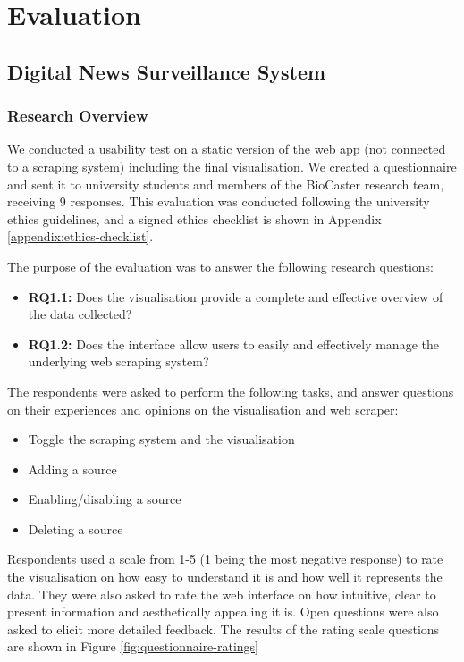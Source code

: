 \documentclass{l4proj}
\begin{document}
\chapter{Evaluation}

\section{Digital News Surveillance System}
\subsection{Research Overview}
We conducted a usability test on a static version of the web app (not connected to a scraping system) including the final visualisation. We created a questionnaire and sent it to university students and members of the BioCaster research team, receiving 9 responses. This evaluation was conducted following the university ethics guidelines, and a signed ethics checklist is shown in Appendix \ref{appendix:ethics-checklist}. \par
The purpose of the evaluation was to answer the following research questions:
\begin{itemize}
    \item \textbf{RQ1.1: } Does the visualisation provide a complete and effective overview of the data collected?
    \item \textbf{RQ1.2: } Does the interface allow users to easily and effectively manage the underlying web scraping system?
\end{itemize}

The respondents were asked to perform the following tasks, and answer questions on their experiences and opinions on the visualisation and web scraper:
\begin{itemize}
    \item Toggle the scraping system and the visualisation
    \item Adding a source
    \item Enabling/disabling a source
    \item Deleting a source
\end{itemize}

Respondents used a scale from 1-5 (1 being the most negative response) to rate the visualisation on how easy to understand it is and how well it represents the data. They were also asked to rate the web interface on how intuitive, clear to present information and aesthetically appealing it is. Open questions were also asked to elicit more detailed feedback. The results of the rating scale questions are shown in Figure \ref{fig:questionnaire-ratings}
\end{document}
